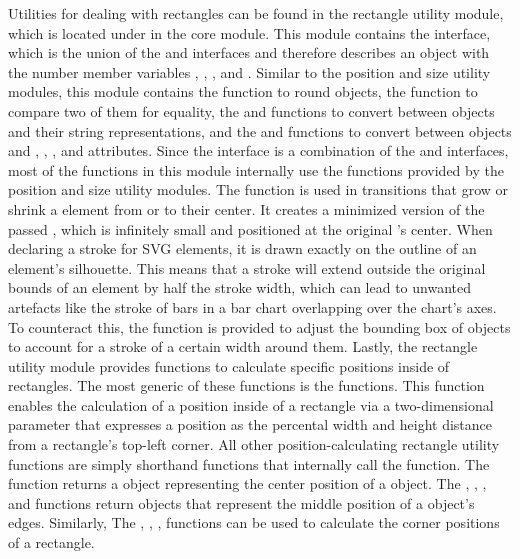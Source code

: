 
Utilities for dealing with rectangles can be found in the rectangle utility module, which is located under  in the core module.
This module contains the  interface, which is the union of the  and  interfaces and therefore describes an object with the number member variables , , , and .
Similar to the position and size utility modules, this module contains the  function to round  objects, the  function to compare two of them for equality, the  and  functions to convert between  objects and their string representations, and the  and  functions to convert between objects and , , , and  attributes.
Since the  interface is a combination of the  and  interfaces, most of the functions in this module internally use the functions provided by the position and size utility modules.
The  function is used in transitions that grow or shrink a  element from or to their center.
It creates a minimized version of the passed , which is infinitely small and positioned at the original 's center.
When declaring a stroke for SVG elements, it is drawn exactly on the outline of an element's silhouette.
This means that a stroke will extend outside the original bounds of an element by half the stroke width, which can lead to unwanted artefacts like the stroke of bars in a bar chart overlapping over the chart's axes.
To counteract this, the  function is provided to adjust the bounding box of  objects to account for a stroke of a certain width around them.
Lastly, the rectangle utility module provides functions to calculate specific positions inside of rectangles.
The most generic of these functions is the  functions.
This function enables the calculation of a position inside of a rectangle via a two-dimensional parameter that expresses a position as the percental width and height distance from a rectangle's top-left corner.
All other position-calculating rectangle utility functions are simply shorthand functions that internally call the  function.
The  function returns a  object representing the center position of a  object.
The , , , and  functions return  objects that represent the middle position of a  object's edges.
Similarly, The , , ,  functions can be used to calculate the corner positions of a rectangle.

